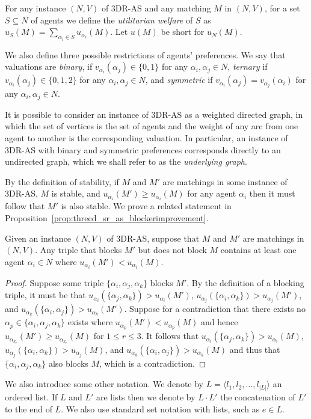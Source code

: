 For any instance $(N, V)$ of 3DR-AS and any matching $M$ in $(N, V)$, for a set $S \subseteq N$ of agents we define the \emph{utilitarian welfare} of $S$ as $u_{S}(M) = \sum_{\alpha_i \in S} u_{\alpha_i}(M)$. Let $u(M)$ be short for $u_{N}(M)$.

We also define three possible restrictions of agents' preferences. We say that valuations are \emph{binary}, if $v_{\alpha_i}(\alpha_j) \in \{ 0, 1 \}$ for any $\alpha_i, \alpha_j \in N$, \emph{ternary} if $v_{\alpha_i}(\alpha_j) \in \{ 0, 1, 2 \}$ for any $\alpha_i, \alpha_j \in N$, and \emph{symmetric} if $v_{\alpha_i}(\alpha_j)=v_{\alpha_j}(\alpha_i)$ for any $\alpha_i, \alpha_j \in N$.

It is possible to consider an instance of 3DR-AS as a weighted directed graph, in which the set of vertices is the set of agents and the weight of any arc from one agent to another is the corresponding valuation. In particular, an instance of 3DR-AS with binary and symmetric preferences corresponds directly to an undirected graph, which we shall refer to as the \emph{underlying graph}.

By the definition of stability, if $M$ and $M'$ are matchings in some instance of 3DR-AS, $M$ is stable, and $u_{\alpha_i}(M') \geq u_{\alpha_i}(M)$ for any agent $\alpha_i$ then it must follow that $M'$ is also stable. We prove a related statement in Proposition~\ref{prop:threed_sr_as_blockerimprovement}.
\begin{prop}
\label{prop:threed_sr_as_blockerimprovement}
Given an instance $(N, V)$ of 3DR-AS, suppose that $M$ and $M'$ are matchings in $(N, V)$. Any triple that blocks $M'$ but does not block $M$ contains at least one agent $\alpha_i \in N$ where $u_{\alpha_i}(M') < u_{\alpha_i}(M)$.
\end{prop}
\begin{proof}
Suppose some triple $\{ \alpha_i, \alpha_j, \alpha_k \}$ blocks $M'$. By the definition of a blocking triple, it must be that $u_{\alpha_i}(\{\alpha_j, \alpha_k \}) > u_{\alpha_i}(M')$, $u_{\alpha_j}(\{\alpha_i, \alpha_k \}) > u_{\alpha_j}(M')$, and $u_{\alpha_k}(\{\alpha_i, \alpha_j \}) > u_{\alpha_k}(M')$. Suppose for a contradiction that there exists no $\alpha_p\in \{ \alpha_i, \alpha_j, \alpha_k \}$ exists where $u_{\alpha_p}(M') < u_{\alpha_p}(M)$ and hence $u_{\alpha_{k_r}}(M') \geq u_{\alpha_{k_r}}(M)$ for $1 \leq r \leq 3$. It follows that $u_{\alpha_i}(\{\alpha_j, \alpha_k \}) > u_{\alpha_i}(M)$, $u_{\alpha_j}(\{\alpha_i, \alpha_k \}) > u_{\alpha_j}(M)$, and $u_{\alpha_k}(\{\alpha_i, \alpha_j \}) > u_{\alpha_k}(M)$ and thus that $\{ \alpha_i, \alpha_j, \alpha_k \}$ also blocks $M$, which is a contradiction.
\end{proof}

We also introduce some other notation. We denote by $L = \langle l_1, l_2, \dots, l_{|L|} \rangle$ an ordered list. If $L$ and $L'$ are lists then we denote by $L \cdot L'$ the concatenation of $L'$ to the end of $L$. We also use standard set notation with lists, such as $e \in L$.